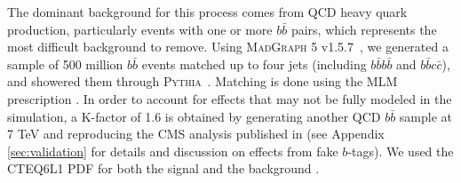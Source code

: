 \documentclass{JHEP3}
\begin{document}
The dominant background for this process comes from QCD heavy quark production, particularly events with one
or more $b\bar{b}$ pairs, which represents the most difficult background to remove. Using \textsc{MadGraph 5}
v1.5.7~\cite{Alwall:2011uj}, we generated a sample of 500 million $b\bar{b}$ events matched up to four jets
(including $b\bar{b}b\bar{b}$ and $b\bar{b}c\bar{c}$), and showered them through
\textsc{Pythia}~\cite{Sjostrand:2006za}.  Matching is done using the MLM prescription \cite{Mangano:2006rw}.
In order to account for effects that may not be fully modeled in the simulation, a K-factor of 1.6 is obtained by
generating another QCD $b\bar{b}$ sample at 7 TeV and reproducing the CMS analysis published in
\cite{Chatrchyan:2013qga} (see Appendix \ref{sec:validation} for details and discussion on effects from fake
$b$-tags). We used the CTEQ6L1 PDF for both the signal and the background \cite{Pumplin:2002vw}.

%
%
\end{document}
